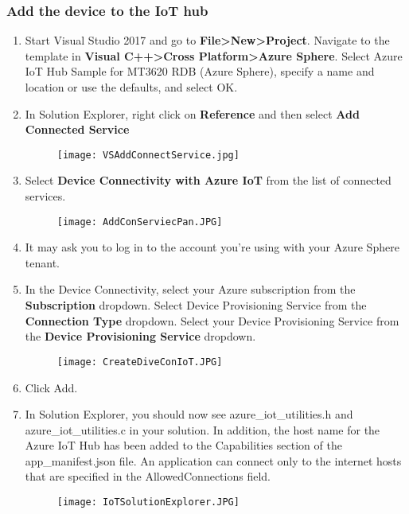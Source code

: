 \subsubsection{Add the device to the IoT hub}
\begin{enumerate}
    \item Start Visual Studio 2017 and go to \textbf{File>New>Project}. Navigate to the template in \textbf{Visual C++>Cross Platform>Azure Sphere}. Select Azure IoT Hub Sample for MT3620 RDB (Azure Sphere), specify a name and location or use the defaults, and select OK.
    \item In Solution Explorer, right click on \textbf{Reference} and then select \textbf{Add Connected Service}
    \begin{figure}[h]
        \centering
        \texttt{[image: VSAddConnectService.jpg]}
    \end{figure}
    \item Select \textbf{Device Connectivity with Azure IoT} from the list of connected services.
    \begin{figure}[h]
        \centering
        \texttt{[image: AddConServiecPan.JPG]}
    \end{figure}
    \item It may ask you to log in to the account you're using with your Azure Sphere tenant.
    \item In the Device Connectivity, select your Azure subscription from the \textbf{Subscription} dropdown. Select Device Provisioning Service from the \textbf{Connection Type} dropdown. Select your Device Provisioning Service from the \textbf{Device Provisioning Service} dropdown.
    \begin{figure}[h]
        \centering
        \texttt{[image: CreateDiveConIoT.JPG]}
    \end{figure}
    \item Click Add.
    \item In Solution Explorer, you should now see azure\_iot\_utilities.h and azure\_iot\_utilities.c in your solution. In addition, the host name for the Azure IoT Hub has been added to the Capabilities section of the app\_manifest.json file. An application can connect only to the internet hosts that are specified in the AllowedConnections field.
    \begin{figure}[h]
        \centering
        \texttt{[image: IoTSolutionExplorer.JPG]}
    \end{figure}
\end{enumerate}

